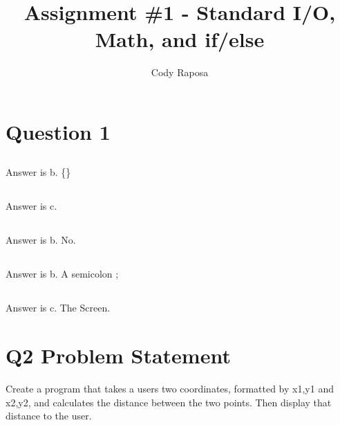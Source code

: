 \documentclass{article}
\title{Assignment \#1 - Standard I/O, Math, and if/else}
\author{Cody Raposa}
\affil{ELEC2850 Microcontrollers Using C Programming}
\begin{document}
\maketitle
\begin{flushleft}
	\section{Question 1}
	\subsection{}
	Answer is b. \{\}
	\subsection{}
	Answer is c.
	\subsection{}
	Answer is b. No.
	\subsection{}
	Answer is b. A semicolon ;
	\subsection{}
	Answer is c. The Screen.
	\newpage
	\section{Q2 Problem Statement}
	Create a program that takes a users two coordinates, formatted by x1,y1 and x2,y2, and calculates the distance between the two points. Then display that distance to the user.

\end{flushleft}
\end{document}
